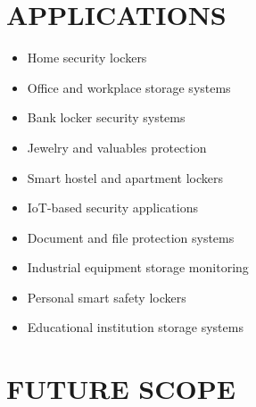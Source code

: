 \documentclass[conference]{IEEEtran}
\begin{document}
\section{APPLICATIONS}

\begin{itemize}

\item Home security lockers

\item Office and workplace storage systems

\item Bank locker security systems

\item Jewelry and valuables protection

\item Smart hostel and apartment lockers

\item IoT-based security applications

\item Document and file protection systems

\item Industrial equipment storage monitoring

\item Personal smart safety lockers

\item Educational institution storage systems

\end{itemize}



\section{FUTURE SCOPE}
\end{document}
